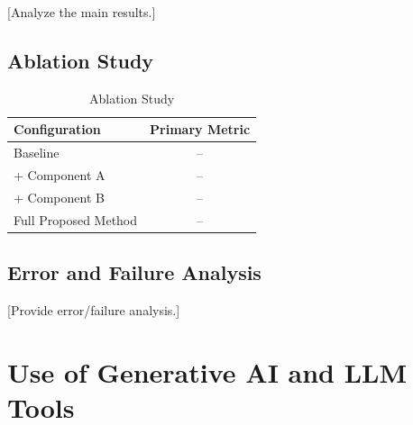 \documentclass[conference]{IEEEtran}
\begin{document}
[Analyze the main results.]


\subsection{Ablation Study}

%
%

\begin{table}[t]
\centering \color{red}
\caption{Ablation Study}
\label{tab:ablation}
\begin{tabular}{lc}
\toprule
\textbf{Configuration} & \textbf{Primary Metric} \\
\midrule

Baseline & -- \\
+ Component A & -- \\
+ Component B & -- \\
Full Proposed Method & -- \\

\bottomrule
\end{tabular}
\end{table}


\subsection{Error and Failure Analysis}

%
%
%

[Provide error/failure analysis.]





\section{Use of Generative AI and LLM Tools}

%
%
%
%
%
%
%
%
\end{document}
